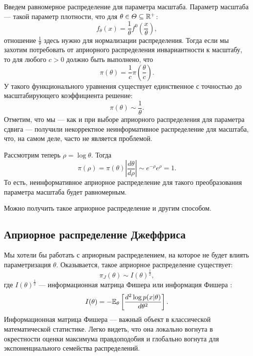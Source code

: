 \begin{example}
Введем равномерное распределение для параметра масштаба.
Параметр масштаба --- такой параметр плотности, что для $\theta \in \varTheta \subseteq \mathbb{R}^+$:
\[
f_\theta(x) = \frac{1}{\theta} f^0 \left(\frac{x}{\theta} \right),
\]
отношение $\frac{1}{\theta}$ здесь нужно для нормализации распределения.
Тогда если мы захотим потребовать от априорного распределения инвариантности к масштабу, 
то для любого $c > 0$ должно быть выполнено, что
\[
\pi(\theta) = \frac{1}{c} \pi \left(\frac{\theta}{c} \right).
\]
У такого функционального уравнения существует единственное с точностью до масштабирующего коэффициента решение:
\[
\pi(\theta) \sim \frac{1}{\theta}.
\]
Отметим, что мы --- как и при выборе априорного распределения для параметра сдвига --- получили некорректное неинформативное распределение для масштаба,
что, на самом деле, часто не является проблемой.

Рассмотрим теперь $\rho = \log \theta$.
Тогда 
\[
\pi(\rho) = \pi(\theta) \left| \frac{d \theta}{d \rho} \right| \sim e^{-\rho} e^{\rho} = 1.
\]
То есть, неинформативное априорное распределение для такого преобразования параметра масштаба будет равномерным.

Можно получить такое априорное распределение и другим способом.
\end{example}



\subsection{Априорное распределение Джеффриса}

Мы хотели бы работать с априорным распределением, на которое не будет влиять параметризация $\theta$.
Оказывается, такое априорное распределение существует:
\[
\pi_J(\theta) \sim I(\theta)^{\frac12},
\]
где $I(\theta)^{\frac12}$ --- информационная матрица Фишера или информация Фишера :
\[
I(\theta) = - \mathbb{E}_{\theta} \left[\frac{d^2 \log p(x| \theta)}{d \theta^2} \right].
\]
Информационная матрица Фишера --- важный объект в классической математической статистике.
Легко видеть, что она локально вогнута в окрестности оценки максимума правдоподобия 
и глобально вогнута для экспоненциального семейства распределений. %

